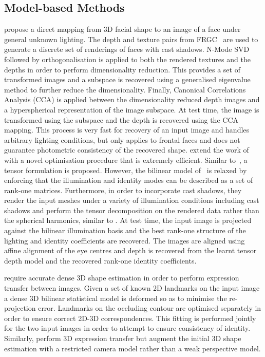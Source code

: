 \subsection{Model-based Methods}\label{subsec:bg_model_based_model}
\citet{minsik2013robust} propose a direct mapping from 3D facial shape to an
image of a face under general unknown lighting. The depth and texture pairs from
FRGC~\cite{phillips2005overview} are used to generate a discrete set of
renderings of faces with cast shadows. N-Mode
SVD~\cite{vasilescu2003multilinear} followed by orthogonalisation is applied to
both the rendered textures and the depths in order to perform dimensionality
reduction. This provides a set of transformed images and a subspace is recovered
using a generalised eigenvalue method to further reduce the dimensionality.
Finally, Canonical Correlations Analysis (CCA) is applied between the
dimensionality reduced depth images and a hyperspherical representation of the
image subspace. At test time, the image is transformed using the subspace and
the depth is recovered using the CCA mapping. This process is very fast for
recovery of an input image and handles arbitrary lighting conditions, but
only applies to frontal faces and does not guarantee photometric consistency
of the recovered shape.
\citet{minsik2014realtime} extend the work of \citet{minsik2011fast} with a
novel optimisation procedure that is extremely efficient. Similar
to~\cite{minsik2011fast}, a tensor formulation is proposed. However, the
bilinear model of~\cite{minsik2011fast} is relaxed by enforcing that the
illumination and identity modes can be described as a set of rank-one matrices.
Furthermore, in order to incorporate cast shadows, they render the input meshes
under a variety of illumination conditions including cast shadows and perform
the tensor decomposition on the rendered data rather than the spherical
harmonics, similar to \citet{minsik2013robust}. At test time, the input image
is projected against the bilinear illumination basis and the best rank-one
structure of the lighting and identity coefficients are recovered. The images
are aligned using affine alignment of the eye centres and depth is recovered
from the learnt tensor depth model and the recovered rank-one identity
coefficients.

\cite{Yang:2011gj} require accurate dense 3D shape estimation in order to
perform expression transfer between images. Given a set of known 2D landmarks on
the input image a dense 3D bilinear statistical model is deformed so as to
minimise the re-projection error. Landmarks on the occluding contour are
optimised separately in order to ensure correct 2D-3D correspondences. This
fitting is performed jointly for the two input images in order to attempt to
ensure consistency of identity.
Similarly, \citet{yang2012face} perform 3D expression transfer
but augment the initial 3D shape estimation with a restricted camera model
rather than a weak perspective model.
